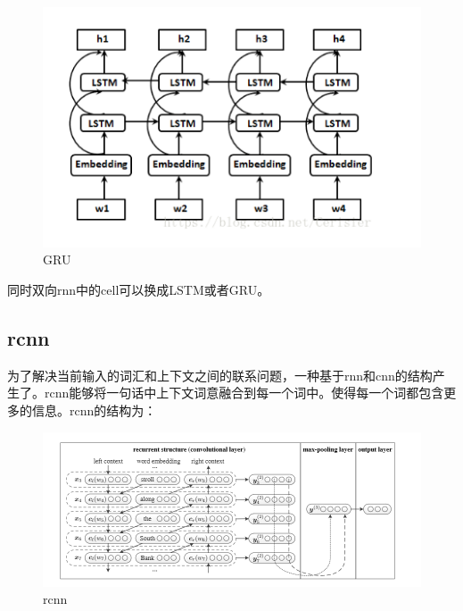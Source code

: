 \documentclass{article}
\begin{document}
\begin{figure}
  \centering
  \includegraphics[width=.8\textwidth]{bi-rnn.png} %
  \caption{GRU}
  \label{fig:fig1}
\end{figure}

同时双向rnn中的cell可以换成LSTM或者GRU。


\subsection{rcnn}

为了解决当前输入的词汇和上下文之间的联系问题，一种基于rnn和cnn的结构产生了。rcnn能够将一句话中上下文词意融合到每一个词中。使得每一个词都包含更多的信息。rcnn的结构为：

\begin{figure}
  \centering
  \includegraphics[width=.8\textwidth]{rcnn.png} %
  \caption{rcnn}
  \label{fig:fig1}
\end{figure}
\end{document}
